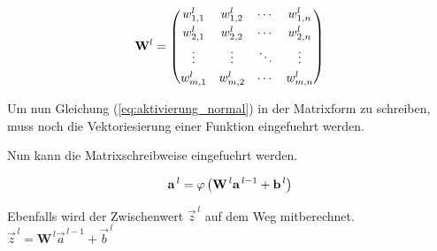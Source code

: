\documentclass[../main]{subfiles}
\begin{document}
\begin{equation}\label{eq:gewichtsmatrix}
  \mathbf{W}^l =
  \begin{pmatrix}
    w_{1,1}^l & w_{1,2}^l & \cdots & w_{1,n}^l \\[0.3em]
    w_{2,1}^l & w_{2,2}^l & \cdots & w_{2,n}^l \\[0.3em]
    \vdots & \vdots & \ddots & \vdots \\[0.3em]
    w_{m,1}^l & w_{m,2}^l & \cdots & w_{m,n}^l
  \end{pmatrix}
\end{equation}

Um nun Gleichung (\ref{eq:aktivierung_normal}) in der Matrixform zu schreiben,
muss noch die Vektoriesierung einer Funktion eingefuehrt werden.
\par\medskip
{}
\par\medskip

Nun kann die Matrixschreibweise eingefuehrt werden.

\begin{equation}\label{eq:activierung_matrix}
  \mathbf{a}^{\,l} = \varphi \left(\mathbf{W}^{\,l} \mathbf{a}^{\,l-1} + \mathbf{b}^{\,l} \right)
\end{equation}

Ebenfalls wird der Zwischenwert $\vec{z}^{\,l}$ auf dem Weg mitberechnet.
$\vec{z}^{\,l} = \mathbf{W}^{\,l} \vec{a}^{\,l-1} + \vec{b}^{\,l}$
\end{document}
